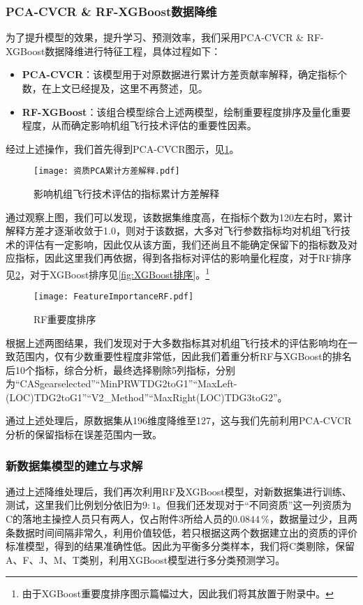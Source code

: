 \documentclass{MathorCupModeling}
\begin{document}
	\subsubsection{PCA-CVCR \& RF-XGBoost数据降维}
	为了提升模型的效果，提升学习、预测效率，我们采用PCA-CVCR \& RF-XGBoost数据降维进行特征工程，具体过程如下：
	\begin{itemize}
		\item \textbf{PCA-CVCR}：该模型用于对原数据进行累计方差贡献率解释，确定指标个数，在上文已经提及，这里不再赘述，见\textcolor{blue}{}。
		\item \textbf{RF-XGBoost}：该组合模型综合上述两模型，绘制重要程度排序及量化重要程度，从而确定影响机组飞行技术评估的重要性因素。
	\end{itemize}
	经过上述操作，我们首先得到PCA-CVCR图示，见\textcolor{blue}{\cref{fig:附件3累计方差解释}}。
	\begin{figure}[H]
		\centering
		\texttt{[image: 资质PCA累计方差解释.pdf]}
		\caption{影响机组飞行技术评估的指标累计方差解释}
		\label{fig:附件3累计方差解释}
	\end{figure}

	通过观察上图，我们可以发现，该数据集维度高，在指标个数为120左右时，累计解释方差才逐渐收敛于1.0，则对于该数据，大多对飞行参数指标均对机组飞行技术的评估有一定影响，因此仅从该方面，我们还尚且不能确定保留下的指标数及对应指标，因此这里我们再依据\textcolor{blue}{}，得到各指标对评估的影响量化程度，对于RF排序见\textcolor{blue}{\cref{fig:RF排序}}，对于XGBoost排序见\textcolor{blue}{\cref{fig:XGBoost排序}}。\textcolor{blue}{\footnote{由于XGBoost重要度排序图示篇幅过大，因此我们将其放置于附录中。}}
	\begin{figure}[H]
		\centering
		\texttt{[image: FeatureImportanceRF.pdf]}
		\caption{RF重要度排序}
		\label{fig:RF排序}
	\end{figure}

	根据上述两图结果，我们发现对于大多数指标其对机组飞行技术的评估影响均在一致范围内，仅有少数重要性程度非常低，因此我们着重分析RF与XGBoost的排名后10个指标，综合分析，最终选择剔除5列指标，分别为“CASgearselected”“MinPRWTDG2toG1”“MaxLeft-\\(LOC)TDG2toG1”“V2\_Method”“MaxRight(LOC)TDG3toG2”。

	通过上述处理后，原数据集从196维度降维至127，这与我们先前利用PCA-CVCR分析的保留指标在误差范围内一致。

	\subsubsection{新数据集模型的建立与求解}
	通过上述降维处理后，我们再次利用RF及XGBoost模型，对新数据集进行训练、测试，这里我们比例划分依旧为$9:1$。但我们还发现对于“不同资质”这一列资质为C的落地主操控人员只有两人，仅占附件3所给人员的$0.0844\,\%$，数据量过少，且两条数据时间间隔非常久，利用价值较低，若只根据这两个数据建立出的资质的评价标准模型，得到的结果准确性低。因此为平衡多分类样本，我们将C类剔除，保留A、F、J、M、T类别，利用XGBoost模型进行多分类预测学习。
\end{document}
